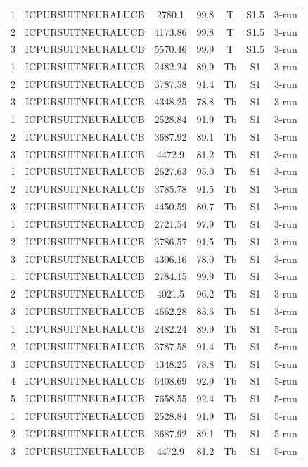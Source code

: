 \documentclass[11pt]{article}
\begin{document}
\begin{center}
\begin{longtable}{|c|c|c|c|c|c|c|}
1 & ICPURSUITNEURALUCB & 2780.1 & 99.8 & T & S1.5 & 3-run \\
2 & ICPURSUITNEURALUCB & 4173.86 & 99.8 & T & S1.5 & 3-run \\
3 & ICPURSUITNEURALUCB & 5570.46 & 99.9 & T & S1.5 & 3-run \\
1 & ICPURSUITNEURALUCB & 2482.24 & 89.9 & Tb & S1 & 3-run \\
2 & ICPURSUITNEURALUCB & 3787.58 & 91.4 & Tb & S1 & 3-run \\
3 & ICPURSUITNEURALUCB & 4348.25 & 78.8 & Tb & S1 & 3-run \\
1 & ICPURSUITNEURALUCB & 2528.84 & 91.9 & Tb & S1 & 3-run \\
2 & ICPURSUITNEURALUCB & 3687.92 & 89.1 & Tb & S1 & 3-run \\
3 & ICPURSUITNEURALUCB & 4472.9 & 81.2 & Tb & S1 & 3-run \\
1 & ICPURSUITNEURALUCB & 2627.63 & 95.0 & Tb & S1 & 3-run \\
2 & ICPURSUITNEURALUCB & 3785.78 & 91.5 & Tb & S1 & 3-run \\
3 & ICPURSUITNEURALUCB & 4450.59 & 80.7 & Tb & S1 & 3-run \\
1 & ICPURSUITNEURALUCB & 2721.54 & 97.9 & Tb & S1 & 3-run \\
2 & ICPURSUITNEURALUCB & 3786.57 & 91.5 & Tb & S1 & 3-run \\
3 & ICPURSUITNEURALUCB & 4306.16 & 78.0 & Tb & S1 & 3-run \\
1 & ICPURSUITNEURALUCB & 2784.15 & 99.9 & Tb & S1 & 3-run \\
2 & ICPURSUITNEURALUCB & 4021.5 & 96.2 & Tb & S1 & 3-run \\
3 & ICPURSUITNEURALUCB & 4662.28 & 83.6 & Tb & S1 & 3-run \\
1 & ICPURSUITNEURALUCB & 2482.24 & 89.9 & Tb & S1 & 5-run \\
2 & ICPURSUITNEURALUCB & 3787.58 & 91.4 & Tb & S1 & 5-run \\
3 & ICPURSUITNEURALUCB & 4348.25 & 78.8 & Tb & S1 & 5-run \\
4 & ICPURSUITNEURALUCB & 6408.69 & 92.9 & Tb & S1 & 5-run \\
5 & ICPURSUITNEURALUCB & 7658.55 & 92.4 & Tb & S1 & 5-run \\
1 & ICPURSUITNEURALUCB & 2528.84 & 91.9 & Tb & S1 & 5-run \\
2 & ICPURSUITNEURALUCB & 3687.92 & 89.1 & Tb & S1 & 5-run \\
3 & ICPURSUITNEURALUCB & 4472.9 & 81.2 & Tb & S1 & 5-run \\

\end{longtable}
\end{center}
\end{document}
